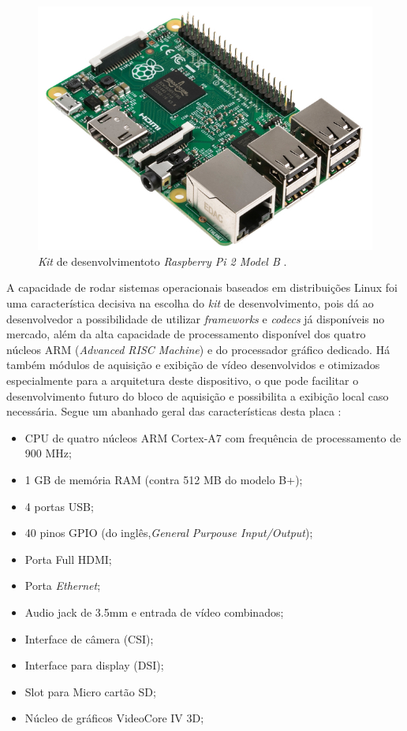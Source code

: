 \begin{figure}[h]
	\centering
	\includegraphics[scale=.5]{figuras/rpi2b.jpg}
	\caption{ \textit{Kit} de desenvolvimentoto \textit{Raspberry Pi 2 Model B} \cite{element14}.}
	\label{fig:rasp}
\end{figure}

A capacidade de rodar sistemas operacionais baseados em distribuições Linux foi uma característica decisiva na escolha do \textit{kit} de desenvolvimento, pois dá ao desenvolvedor a possibilidade de utilizar \textit{frameworks} e \textit{codecs} já disponíveis no mercado, além da alta capacidade de processamento disponível dos quatro núcleos ARM (\textit{Advanced RISC Machine}) e do processador gráfico dedicado. Há também módulos de aquisição e exibição de vídeo desenvolvidos e otimizados especialmente para a arquitetura deste dispositivo, o que pode facilitar o desenvolvimento futuro do bloco de aquisição e possibilita a exibição local caso necessária. Segue um abanhado geral das características desta placa  \cite{raspberryOrg} :
\begin{itemize}
\item CPU de quatro núcleos ARM Cortex-A7 com frequência de processamento de 900 MHz;
\item  1 GB de memória RAM (contra 512 MB do modelo B+);
\item 4 portas USB;
\item 40 pinos GPIO (do inglês,\textit{General Purpouse Input/Output});
\item Porta Full HDMI;
\item Porta \textit{Ethernet};
\item Audio jack de 3.5mm e entrada de vídeo combinados;
\item Interface de câmera (CSI);
\item Interface para display (DSI);
\item Slot para Micro cartão SD;
\item Núcleo de gráficos VideoCore IV 3D;
\end{itemize}

